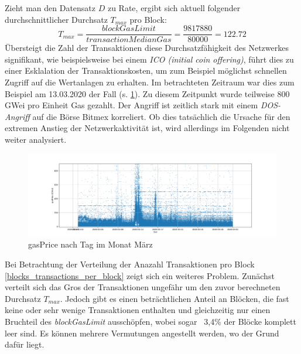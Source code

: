 \documentclass[runningheads]{llncs}
\begin{document}
Zieht man den Datensatz $ D $ zu Rate, ergibt sich aktuell folgender durchschnittlicher Durchsatz $ T_{max} $ pro Block: \cite{neemann_appendix_nodate}
$$
  T_{max} = \frac{\textit{blockGasLimit}}{\textit{transactionMedianGas}} = \frac{9817880}{80000} = 122.72
$$
Übersteigt die Zahl der  Transaktionen diese Durchsatzfähigkeit des Netzwerkes signifikant, wie beispielsweise bei einem \textit{ICO (initial coin offering)}, führt dies zu einer Esklalation der Transaktionskosten, um zum Beispiel möglichst schnellen Zugriff auf die Wertanlagen zu erhalten. \cite[S. 9:6 f.]{m.spain_oasics-tokeneconomics_2019} Im betrachteten Zeitraum war dies zum Beispiel am 13.03.2020 der Fall (s. \ref{transactions_gasprice_timeseries}). Zu diesem Zeitpunkt wurde teilweise 800 GWei pro Einheit Gas gezahlt. Der Angriff ist zeitlich stark mit einem \textit{DOS-Angriff} auf die Börse Bitmex korreliert. Ob dies tatsächlich die Ursache für den extremen Anstieg der Netzwerkaktivität ist, wird allerdings im Folgenden nicht weiter analysiert. \cite{bitmex_ddos_nodate}

\begin{figure}[h!]
  \centerline{\includegraphics[width=\textwidth, keepaspectratio]{transactions_gasprice_timeseries.png}}
  \caption{gasPrice nach Tag im Monat März \cite{neemann_appendix_nodate}}
  \label{transactions_gasprice_timeseries}
\end{figure}

Bei Betrachtung der Verteilung der Anazahl Transaktionen pro Block \ref{blocks_transactions_per_block} zeigt sich ein weiteres Problem. Zunächst verteilt sich das Gros der Transaktionen ungefähr um den zuvor berechneten Durchsatz $ T_{max} $. Jedoch gibt es einen beträchtlichen Anteil an Blöcken, die fast keine oder sehr wenige Transaktionen enthalten und gleichzeitig nur einen Bruchteil des \textit{blockGasLimit} ausschöpfen, wobei sogar ~3,4\% der Blöcke komplett leer sind. \cite{neemann_appendix_nodate} Es können mehrere Vermutungen angestellt werden, wo der Grund dafür liegt.
\end{document}
